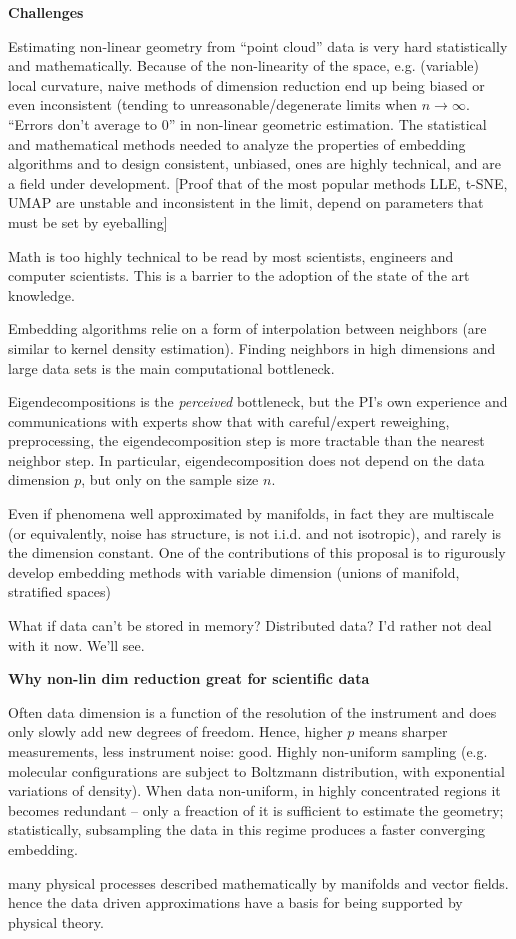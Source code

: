 \documentclass[floatfix,11pt]{article}
\begin{document}
  \textbf{Challenges}
  \bit
\item Estimating non-linear geometry from ``point cloud'' data is very hard statistically and mathematically. Because of the non-linearity of the space, e.g.  (variable) local curvature, naive methods of dimension reduction end up being biased or even inconsistent (tending to unreasonable/degenerate limits when $n\rightarrow \infty$. ``Errors don't average to 0'' in non-linear geometric estimation. The statistical and mathematical methods needed to analyze the properties of embedding algorithms and to design consistent, unbiased, ones are highly technical, and are a field under development. [Proof that of the most popular methods LLE, t-SNE, UMAP are unstable and inconsistent in the limit, depend on parameters that must be set by eyeballing]
\item Math is too highly technical to be read by most scientists, engineers and computer scientists. This is a barrier to the adoption of the state of the art knowledge. 
\item Embedding algorithms relie on a form of interpolation between neighbors (are similar to kernel density estimation). Finding neighbors in high dimensions and large data sets is the main computational bottleneck. 
\item Eigendecompositions is the {\em perceived} bottleneck, but the PI's own experience and communications with experts show that with careful/expert reweighing, preprocessing, the eigendecomposition step is more tractable than the nearest neighbor step. In particular, eigendecomposition does not depend on the data dimension $p$, but only on the sample size $n$. 
\item Even if phenomena well approximated by manifolds, in fact they are multiscale (or equivalently, noise has structure, is not i.i.d. and not isotropic), and rarely is the dimension constant. One of the contributions of this proposal is to rigurously develop embedding methods with variable dimension (unions of manifold, stratified spaces)
\item What if data can't be stored in memory? Distributed data? I'd rather not deal with it now. We'll see. 
  \eit
  
  {\bf Why non-lin dim reduction great for scientific data}
  \bit
  \item Often data
dimension is a function of the resolution of the instrument and does
only slowly add new degrees of freedom. Hence, higher $p$ means
sharper measurements, less instrument noise: good. Highly non-uniform
sampling (e.g. molecular configurations are subject to Boltzmann
distribution, with exponential variations of density). When data
non-uniform, in highly concentrated regions it becomes redundant --
only a freaction of it is sufficient to estimate the geometry;
statistically, subsampling the data in this regime produces a faster
converging embedding.
\item many physical processes described mathematically by manifolds and vector fields. hence the data driven approximations have a basis for being supported by physical theory.
\eit
\end{document}
